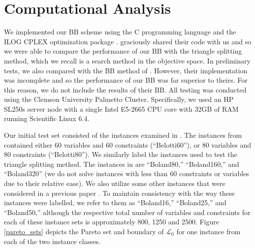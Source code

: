 \documentclass[11.5pt]{article}
\newcommand{\bb}{BB}
\newcommand{\R}{\mathbb{R}}
\renewcommand{\L}{\mathcal{L}}
\newcommand{\N}{\mathcal{N}}
\begin{document}
%


\section{Computational Analysis} \label{sec:compute}
We implemented our \bb{} scheme using the C programming language and the ILOG CPLEX optimization package \citep{Cplex}.  \citet{boland2015acriterion} graciously shared their code with us and so we were able to compare the performance of our BB with the triangle splitting method, which we recall is a search method in the objective space. In preliminary tests, we also compared with the BB method of \citep{belotti2012biobjective}. However, their implementation was incomplete and so the performance of our \bb{} was far superior to theirs. For this reason, we do not include the results of their \bb{}. All testing was conducted using the Clemson University Palmetto Cluster. Specifically, we used an HP SL250s server node with a single Intel E5-2665 CPU core with 32GB of RAM running Scientific Linux 6.4.%

Our initial test set consisted of the instances examined in \citep{belotti2012biobjective,boland2015acriterion}. The instances from \citep{belotti2012biobjective} contained either 60 variables and 60 constraints (``Belotti60''), or 80 variables and 80 constraints (``Belotti80''). We similarly label the instances used to test the triangle splitting method. The instances in \citep{boland2015acriterion} are ``Boland80,'' ``Boland160,'' and ``Boland320'' (we do not solve instances with less than 60 constraints or variables due to their relative ease). We also utilize some other instances that were considered in a previous paper \citep{boland2013criterion}. To maintain consistency with the way these instances were labelled, we refer to them as ``Boland16,'' ``Boland25,'' and ``Boland50,'' although the respective total number of variables and constraints for each of these instance sets is approximately 800, 1250 and 2500. Figure \ref{pareto_sets} depicts the Pareto set and boundary of $\L_0$ for one instance from each of the two instance classes.
\end{document}
